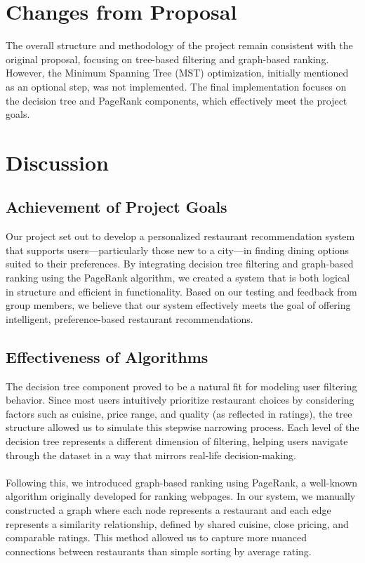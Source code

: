 \documentclass[fontsize=11pt]{article}
\begin{document}
\section*{Changes from Proposal}
The overall structure and methodology of the project remain consistent with the original proposal, focusing on tree-based filtering and graph-based ranking. However, the Minimum Spanning Tree (MST) optimization, initially mentioned as an optional step, was not implemented. The final implementation focuses on the decision tree and PageRank components, which effectively meet the project goals.

\section*{Discussion}

\subsection*{Achievement of Project Goals}

Our project set out to develop a personalized restaurant recommendation system that supports users—particularly those new to a city—in finding dining options suited to their preferences. By integrating decision tree filtering and graph-based ranking using the PageRank algorithm, we created a system that is both logical in structure and efficient in functionality. Based on our testing and feedback from group members, we believe that our system effectively meets the goal of offering intelligent, preference-based restaurant recommendations.

\subsection*{Effectiveness of Algorithms}

The decision tree component proved to be a natural fit for modeling user filtering behavior. Since most users intuitively prioritize restaurant choices by considering factors such as cuisine, price range, and quality (as reflected in ratings), the tree structure allowed us to simulate this stepwise narrowing process. Each level of the decision tree represents a different dimension of filtering, helping users navigate through the dataset in a way that mirrors real-life decision-making. \\ \\ 
Following this, we introduced graph-based ranking using PageRank, a well-known algorithm originally developed for ranking webpages. In our system, we manually constructed a graph where each node represents a restaurant and each edge represents a similarity relationship, defined by shared cuisine, close pricing, and comparable ratings. This method allowed us to capture more nuanced connections between restaurants than simple sorting by average rating.
\end{document}
